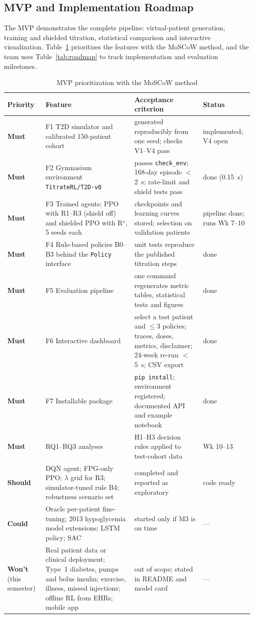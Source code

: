 \documentclass[conference]{IEEEtran}
\begin{document}
\subsection{MVP and Implementation Roadmap}
The MVP demonstrates the complete pipeline: virtual-patient generation, training and shielded
titration, statistical comparison and interactive visualization. Table~\ref{tab:moscow}
prioritizes the features with the MoSCoW method, and the team uses Table~\ref{tab:roadmap} to
track implementation and evaluation milestones.

\begin{table}[t]
\centering
\caption{MVP prioritization with the MoSCoW method}
\label{tab:moscow}
\scriptsize
\begin{tabular}{@{}p{1.3cm}p{6.2cm}p{6.9cm}p{2.3cm}@{}}
\toprule
\textbf{Priority} & \textbf{Feature} & \textbf{Acceptance criterion} & \textbf{Status} \\
\midrule
\textbf{Must} & F1 T2D simulator and calibrated 150-patient cohort & generated reproducibly from one seed; checks V1--V4 pass & implemented; V4 open \\
\textbf{Must} & F2 Gymnasium environment \texttt{TitrateRL/T2D-v0} & passes \texttt{check\_env}; 168-day episode $<$2~s; rate-limit and shield tests pass & done (0.15~s) \\
\textbf{Must} & F3 Trained agents: PPO with R1--R3 (shield off) and shielded PPO with R$^\star$, 5 seeds each & checkpoints and learning curves stored; selection on validation patients & pipeline done; runs Wk 7--10 \\
\textbf{Must} & F4 Rule-based policies B0--B3 behind the \texttt{Policy} interface & unit tests reproduce the published titration steps & done \\
\textbf{Must} & F5 Evaluation pipeline & one command regenerates metric tables, statistical tests and figures & done \\
\textbf{Must} & F6 Interactive dashboard & select a test patient and $\leq$3 policies; traces, doses, metrics, disclaimer; 24-week re-run $<$5~s; CSV export & done \\
\textbf{Must} & F7 Installable package & \texttt{pip install}; environment registered; documented API and example notebook & done \\
\textbf{Must} & RQ1--RQ3 analyses & H1--H3 decision rules applied to test-cohort data & Wk 10--13 \\
\midrule
\textbf{Should} & DQN agent; FPG-only PPO; $\lambda$ grid for R3; simulator-tuned rule B4; robustness scenario set & completed and reported as exploratory & code ready \\
\textbf{Could} & Oracle per-patient fine-tuning; 2013 hypoglycemia model extensions; LSTM policy; SAC & started only if M3 is on time & --- \\
\textbf{Won't} (this semester) & Real patient data or clinical deployment; Type~1 diabetes, pumps and bolus insulin; exercise, illness, missed injections; offline RL from EHRs; mobile app & out of scope; stated in README and model card & --- \\
\bottomrule
\end{tabular}
\end{table}
\end{document}
